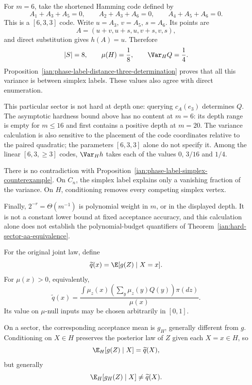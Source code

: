 \begin{remark}
\label{ian:phase-label-six-dimensional-check}
For \(m=6\), take the shortened Hamming code defined by
\[
 A_1+A_3+A_5=0,\qquad
 A_2+A_3+A_6=0,\qquad
 A_4+A_5+A_6=0.
\]
This is a \([6,3,3]\) code. Write
\(u=A_3\), \(v=A_5\), \(s=A_6\). Its points are
\[
 A=(u+v,u+s,u,v+s,v,s),
\]
and direct substitution gives \(h(A)=u\). Therefore
\[
 |S|=8,\qquad
 \mu(H)=\frac18,\qquad
 \Var_H Q=\frac14.
\]
Proposition~\ref{ian:phase-label-distance-three-determination} proves that all this variance is between simplex labels. These values also agree with direct enumeration.

This particular sector is not hard at depth one: querying \(c_A(e_3)\) determines \(Q\). The asymptotic hardness bound above has no content at \(m=6\): its depth range is empty for \(m\le16\) and first contains a positive depth at \(m=20\). The variance calculation is also sensitive to the placement of the code coordinates relative to the paired quadratic; the parameters \([6,3,3]\) alone do not specify it. Among the linear \([6,3,\ge3]\) codes, \(\Var_Hh\) takes each of the values \(0\), \(3/16\) and \(1/4\).

There is no contradiction with
Proposition~\ref{ian:phase-label-simplex-counterexample}. On \(C_n\), the simplex label explains only a vanishing fraction of the variance. On \(H\), conditioning removes every competing simplex vertex.

Finally, \(2^{-r}=\Theta(m^{-1})\) is polynomial weight in \(m\), or in the displayed depth. It is not a constant lower bound at fixed acceptance accuracy, and this calculation alone does not establish the polynomial-budget quantifiers of
Theorem~\ref{ian:hard-sector-aa-equivalence}.
\end{remark}

\begin{definition}
\label{ian:phase-label-posterior-smoothed-definition}
For the original joint law, define
\[
 \widetilde q(x)=\E[g(Z)\mid X=x].
\]
For \(\mu(x)>0\), equivalently,
\[
 \widetilde q(x)=
 \frac{\displaystyle\int
       \mu_z(x)\left(\sum_y\mu_z(y)Q(y)\right)\pi(dz)}
      {\mu(x)}.
\]
Its value on \(\mu\)-null inputs may be chosen arbitrarily in \([0,1]\).

On a sector, the corresponding acceptance mean is \(g_H\), generally different from \(g\). Conditioning on \(X\in H\) preserves the posterior law of \(Z\) given each \(X=x\in H\), so
\[
 \E_H[g(Z)\mid X]=\widetilde q(X),
\]
but generally
\[
 \E_H[g_H(Z)\mid X]\ne\widetilde q(X).
\]
\end{definition}

